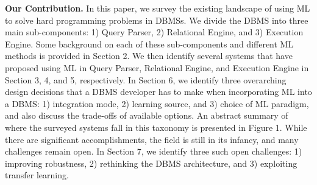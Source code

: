 \vspace{2mm}
\noindent \textbf{Our Contribution.} In this paper, we survey the existing landscape of using ML to solve hard programming problems in DBMSs. 
We divide the DBMS into three main sub-components: 1) Query Parser, 2) Relational Engine, and 3) Execution Engine. Some background on each of these sub-components and different ML methods is provided in Section 2.
We then identify several systems that have proposed using ML in Query Parser, Relational Engine, and Execution Engine in Section 3, 4, and 5, respectively.
In Section 6, we identify three overarching design decisions that a DBMS developer has to make when incorporating ML into a DBMS: 1) integration mode, 2) learning source, and 3) choice of ML paradigm, and also discuss the trade-offs of available options.
An abstract summary of where the surveyed systems fall in this taxonomy is presented in Figure 1.
While there are significant accomplishments, the field is still in its infancy, and many challenges remain open.
In Section 7, we identify three such open challenges: 1) improving robustness, 2) rethinking the DBMS architecture, and 3) exploiting transfer learning.